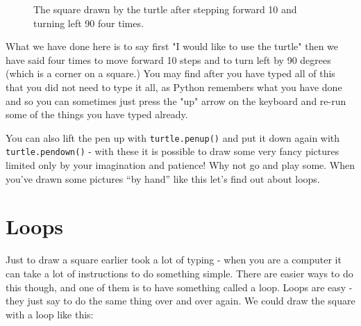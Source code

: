 \documentclass[a4paper, 11pt]{book}
\begin{document}
\begin{figure}
\label{figure-turtle-001-square}
\centering
{}
\caption{The square drawn by the turtle after stepping forward 10 and
  turning left 90 four times.}
\end{figure}

What we have done here is to say first "I would like to use the turtle" then we have said four times to move forward 10 steps and to turn left by 90 degrees (which is a corner on a square.) You may find after you have typed all of this that you did not need to type it all, as Python remembers what you have done and so you can sometimes just press the "up" arrow on the keyboard and re-run some of the things you have typed already.

You can also lift the pen up with \verb|turtle.penup()| and put it down again with \verb|turtle.pendown()| - with these it is possible to draw some very fancy pictures limited only by your imagination and patience! Why not go and play some. When you've drawn some pictures ``by hand'' like this let's find out about loops.

\section{Loops}

Just to draw a square earlier took a lot of typing - when you are a computer it can take a lot of instructions to do something simple. There are easier ways to do this though, and one of them is to have something called a loop. Loops are easy - they just say to do the same thing over and over again. We could draw the square with a loop like this:
\end{document}
